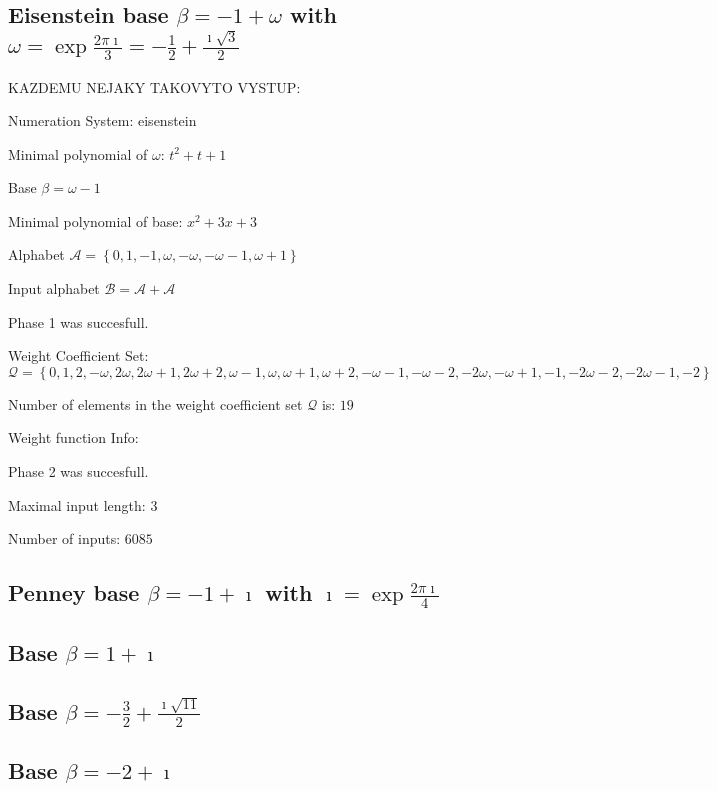 




\subsection{Eisenstein base $\beta = -1 + \omega$ with $\omega = \exp{\frac{2 \pi \imath}{3}} = -\frac{1}{2} + \frac{\imath \sqrt{3}}{2}$}
KAZDEMU NEJAKY TAKOVYTO VYSTUP:

Numeration System: eisenstein 

Minimal polynomial of $\omega$: $ t^{2} + t + 1 $

Base $\beta= \omega - 1 $

Minimal polynomial of base: $ x^{2} + 3x + 3 $

Alphabet $\mathcal{A} =\left\{0, 1, -1, \omega, -\omega, -\omega - 1, \omega + 1\right\}$

Input alphabet $\mathcal{B} =\mathcal{A}+ \mathcal{A}$

Phase 1 was succesfull. 

Weight Coefficient Set:
\begin{equation*}
 \mathcal{Q}=\left\{0, 1, 2, -\omega, 2\omega, 2\omega + 1, 2\omega + 2, \omega - 1, \omega, \omega + 1, \omega + 2, -\omega - 1, -\omega - 2, -2\omega, -\omega + 1, -1, -2\omega - 2, -2\omega - 1, -2\right\}
\end{equation*}


Number of elements in the weight coefficient set $\mathcal{Q}$ is: $ 19 $

Weight function Info:

Phase 2 was succesfull. 

Maximal input length: $ 3 $


Number of inputs: $ 6085 $


\subsection{Penney base $\beta = -1 + \imath$ with $\imath = \exp{\frac{2 \pi \imath}{4}}$}


\subsection{Base $\beta = 1 + \imath$}


\subsection{Base $\beta = -\frac{3}{2} + \frac{\imath \sqrt{11}}{2}$}


\subsection{Base $\beta = -2 + \imath$}

